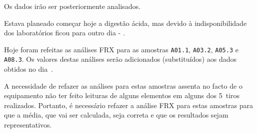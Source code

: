 

Os dados irão ser posteriormente analisados.

\hrulefill



Estava planeado começar hoje a digestão ácida, mas devido à indisponibilidade dos laboratórios ficou para outro dia - .

\hrulefill



Hoje foram refeitas as análises FRX para as amostras \texttt{A01.1}, \texttt{A03.2}, \texttt{A05.3} e \texttt{A08.3}.
Os valores destas análises serão adicionados (substituídos) aos dados obtidos no dia~.

A necessidade de refazer as análises para estas amostras assenta no facto de o equipamento não ter feito leituras de alguns elementos em alguns dos 5~tiros realizados.
Portanto, é necessário refazer a análise FRX para estas amostras para que a média, que vai ser calculada, seja correta e que os resultados sejam representativos.


